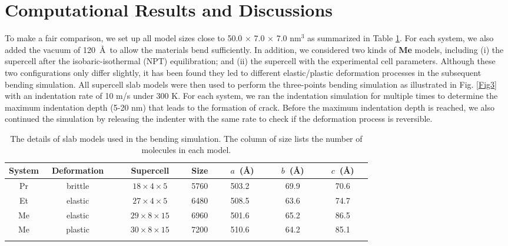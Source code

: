 \documentclass[prb,superscriptaddress,longbibliography, twocolumn]{revtex4-1}
\begin{document}
\section{Computational Results and Discussions}
To make a fair comparison, we set up all model sizes close to 50.0 $\times$ 7.0 $\times$ 7.0 nm$^3$ as summarized in Table \ref{table3}. For each system, we also added the vacuum of 120~\AA~to allow the materials bend sufficiently. In addition, we considered two kinds of \textbf{Me} models, including (i) the supercell after the isobaric-isothermal (NPT) equilibration; and (ii) the supercell with the experimental cell parameters. Although these two configurations only differ slightly, it has been found they led to different elastic/plastic deformation processes in the subsequent bending simulation. All supercell slab models were then used to perform the three-points bending simulation as illustrated in Fig. \ref{Fig3} with an indentation rate of 10 m/s under 300 K. For each system, we ran the indentation simulation for multiple times to determine the maximum indentation depth (5-20 nm) that leads to the formation of crack. Before the maximum indentation depth is reached, we also continued the simulation by releasing the indenter with the same rate to check if the deformation process is reversible. 


\begin{table}[ht]
  \centering
  \caption{The details of slab models used in the bending simulation. The column of size lists the number of molecules in each model.}
\begin{tabular}{ccccccc}
\hline\hline
System &~Deformation~& ~~~Supercell~~~ & Size & ~~~$a$~(\AA)~~&~~$b$~(\AA)~~&~~$c$~(\AA)~~\\ \hline
Pr         & brittle    & $18\times4\times5$ & 5760 & 503.2 & 69.9 & 70.6  \\ 
Et         & elastic    & $27\times4\times5$ & 6480 & 508.5 & 63.6 & 74.7  \\ 
Me         & elastic    & $29\times8\times15$ & 6960 & 501.6 & 65.2 & 86.5  \\ 
Me         & plastic    & $30\times8\times15$ & 7200 & 510.6 & 64.2 & 85.1  \\ 
\hline\hline
\label{table3}
\end{tabular}
\end{table}
\end{document}
